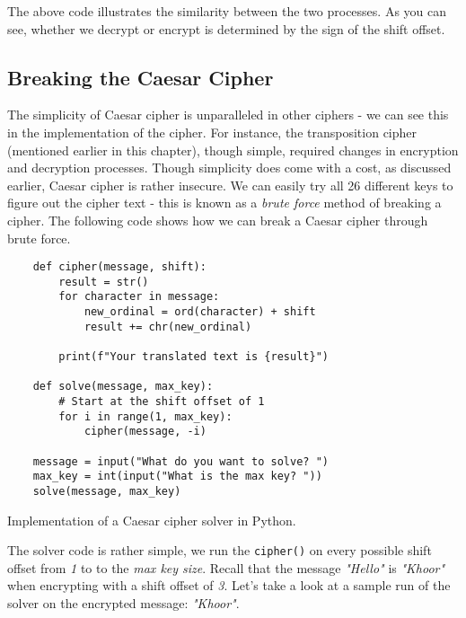 The above code illustrates the similarity between the two processes. As you can see, whether we decrypt or encrypt is 
determined by the sign of the shift offset.

\subsection{Breaking the Caesar Cipher}

The simplicity of Caesar cipher is unparalleled in other ciphers - we can see this in the implementation of the cipher.
For instance, the transposition cipher (mentioned earlier in this chapter), though simple, required changes in encryption and
decryption processes. Though simplicity does come with a cost, as discussed earlier, Caesar cipher is rather insecure. 
We can easily try all 26 different keys to figure out the cipher text - this is known as a \textit{brute force} method
of breaking a cipher. The following code shows how we can break a Caesar cipher through brute force. 

\begin{listing}[H]
    \begin{verbatim}
    def cipher(message, shift):
        result = str()
        for character in message:
            new_ordinal = ord(character) + shift
            result += chr(new_ordinal)
        
        print(f"Your translated text is {result}")
    
    def solve(message, max_key):
        # Start at the shift offset of 1
        for i in range(1, max_key):
            cipher(message, -i)
    
    message = input("What do you want to solve? ")
    max_key = int(input("What is the max key? "))
    solve(message, max_key)  
        \end{verbatim}
        \caption{Implementation of a Caesar cipher solver in Python.}
\end{listing}

The solver code is rather simple, we run the \texttt{cipher()} on every possible shift offset from \textit{1} to
to the \textit{max key size}. Recall that the message \textit{"Hello"} is \textit{"Khoor"} when encrypting with a 
shift offset of \textit{3}. Let's take a look at a sample run of the solver on the encrypted message: \textit{"Khoor"}.

\newcommand{\reducedstrut}{\vrule width 0pt height .9\ht\strutbox depth .9\dp\strutbox\relax}
\newcommand{\yellow}[1]{%
  \begingroup
  \setlength{\fboxsep}{0pt}%
  \colorbox{yellow}{\reducedstrut#1\/}%
  \endgroup
}

